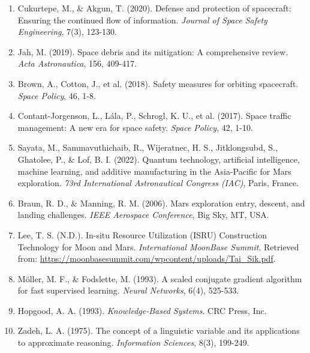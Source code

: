 \documentclass[a4paper, 11pt]{article}
\begin{document}
\begin{enumerate}
    \item Cukurtepe, M., \& Akgun, T. (2020). Defense and protection of spacecraft: Ensuring the continued flow of information. \textit{Journal of Space Safety Engineering}, 7(3), 123-130. \cite{cukurtepe2020defense}
    
    \item Jah, M. (2019). Space debris and its mitigation: A comprehensive review. \textit{Acta Astronautica}, 156, 409-417. \cite{jah2019space}
    
    \item Brown, A., Cotton, J., et al. (2018). Safety measures for orbiting spacecraft. \textit{Space Policy}, 46, 1-8. \cite{brown2018safety}
    
    \item Contant-Jorgenson, L., Lála, P., Schrogl, K. U., et al. (2017). Space traffic management: A new era for space safety. \textit{Space Policy}, 42, 1-10. \cite{contant2017space}
    
    \item Sayata, M., Sammavuthichaib, R., Wijeratnec, H. S., Jitklongsubd, S., Ghatolee, P., \& Lof, B. I. (2022). Quantum technology, artificial intelligence, machine learning, and additive manufacturing in the Asia-Pacific for Mars exploration. \textit{73rd International Astronautical Congress (IAC)}, Paris, France. \cite{sayata2022quantum}
    
    \item Braun, R. D., \& Manning, R. M. (2006). Mars exploration entry, descent, and landing challenges. \textit{IEEE Aerospace Conference}, Big Sky, MT, USA. \cite{braun2006mars}
    
    \item Lee, T. S. (N.D.). In-situ Resource Utilization (ISRU) Construction Technology for Moon and Mars. \textit{International MoonBase Summit}. Retrieved from: \url{https://moonbasesummit.com/wpcontent/uploads/Tai_Sik.pdf}. \cite{leeISRU}
    
    \item Möller, M. F., \& Fodslette, M. (1993). A scaled conjugate gradient algorithm for fast supervised learning. \textit{Neural Networks}, 6(4), 525-533. \cite{moller1993scaled}
    
    \item Hopgood, A. A. (1993). \textit{Knowledge-Based Systems}. CRC Press, Inc. \cite{hopgood1993knowledge}
    
    \item Zadeh, L. A. (1975). The concept of a linguistic variable and its applications to approximate reasoning. \textit{Information Sciences}, 8(3), 199-249. \cite{zadeh1975linguistic}
    

\end{enumerate}
\end{document}
